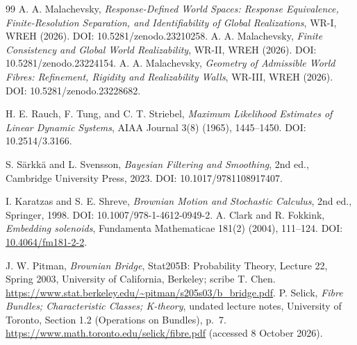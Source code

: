 \documentclass[11pt]{article}
\begin{document}
\begin{thebibliography}{99}
 A. A. Malachevsky, \emph{Response-Defined World Spaces: Response Equivalence, Finite-Resolution Separation, and Identifiability of Global Realizations}, WR-I, WREH (2026). DOI: 10.5281/zenodo.23210258.
 A. A. Malachevsky, \emph{Finite Consistency and Global World Realizability}, WR-II, WREH (2026). DOI: 10.5281/zenodo.23224154.
 A. A. Malachevsky, \emph{Geometry of Admissible World Fibres: Refinement, Rigidity and Realizability Walls}, WR-III, WREH (2026). DOI: 10.5281/zenodo.23228682.

H. E. Rauch, F. Tung, and C. T. Striebel,
\emph{Maximum Likelihood Estimates of Linear Dynamic Systems},
AIAA Journal 3(8) (1965), 1445--1450.
DOI: 10.2514/3.3166.

S. S\"arkk\"a and L. Svensson,
\emph{Bayesian Filtering and Smoothing}, 2nd ed.,
Cambridge University Press, 2023.
DOI: 10.1017/9781108917407.

I. Karatzas and S. E. Shreve,
\emph{Brownian Motion and Stochastic Calculus}, 2nd ed.,
Springer, 1998.
DOI: 10.1007/978-1-4612-0949-2.
A. Clark and R. Fokkink,
\emph{Embedding solenoids},
Fundamenta Mathematicae 181(2) (2004), 111--124.
DOI: \href{https://doi.org/10.4064/fm181-2-2}{10.4064/fm181-2-2}.

J. W. Pitman, \emph{Brownian Bridge},
Stat205B: Probability Theory, Lecture 22, Spring 2003,
University of California, Berkeley; scribe T. Chen.
\url{https://www.stat.berkeley.edu/~pitman/s205s03/b_bridge.pdf}.
P. Selick, \emph{Fibre Bundles; Characteristic Classes; K-theory},
undated lecture notes, University of Toronto,
Section 1.2 (Operations on Bundles), p.\ 7.
\url{https://www.math.toronto.edu/selick/fibre.pdf}
(accessed 8 October 2026).
\end{thebibliography}
\end{document}
